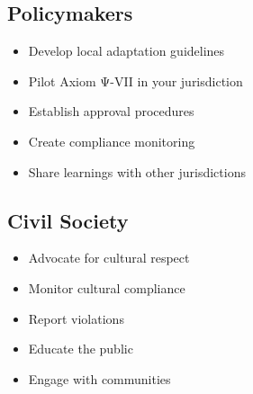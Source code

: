 \subsection{Policymakers}

\begin{itemize}
    \item Develop local adaptation guidelines
    \item Pilot Axiom Ψ-VII in your jurisdiction
    \item Establish approval procedures
    \item Create compliance monitoring
    \item Share learnings with other jurisdictions
\end{itemize}

\subsection{Civil Society}

\begin{itemize}
    \item Advocate for cultural respect
    \item Monitor cultural compliance
    \item Report violations
    \item Educate the public
    \item Engage with communities
\end{itemize}

\cleardoublepage

